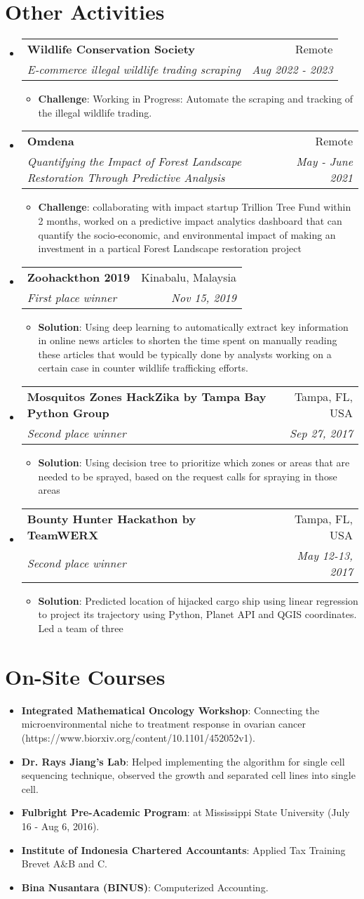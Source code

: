\documentclass[letterpaper,10pt]{article}
\makeatletter
\newcommand{\resumeItem}[2]{
  \item\small{
    \textbf{#1}{: #2 \vspace{-2pt}}
  }
}
\newcommand{\resumeSubheading}[4]{
  \vspace{-1pt}\item
    \begin{tabular*}{0.97\textwidth}[t]{l@{\extracolsep{\fill}}r}
      \textbf{#1} & #2 \\
      \textit{\small#3} & \textit{\small #4} \\
    \end{tabular*}\vspace{-5pt}
}
\newcommand{\resumeSubItem}[2]{\resumeItem{#1}{#2}\vspace{-4pt}}
\newcommand{\resumeSubHeadingListStart}{\begin{itemize}[leftmargin=*]}
\newcommand{\resumeSubHeadingListEnd}{\end{itemize}}
\newcommand{\resumeItemListStart}{\begin{itemize}}
\newcommand{\resumeItemListEnd}{\end{itemize}\vspace{-5pt}}
\makeatother
\begin{document}
\section{Other Activities}
  \resumeSubHeadingListStart
    \resumeSubheading
    {Wildlife Conservation Society}{Remote}
    {E-commerce illegal wildlife trading scraping}{Aug 2022 - 2023}
      \resumeItemListStart
        \resumeItem{Challenge}
        {Working in Progress: Automate the scraping and tracking of the illegal wildlife trading.}
      \resumeItemListEnd
    \resumeSubheading
    {Omdena}{Remote}
    {Quantifying the Impact of Forest Landscape Restoration Through Predictive Analysis}{May - June 2021}
      \resumeItemListStart
        \resumeItem{Challenge}
        {collaborating with impact startup  Trillion Tree Fund within 2 months, worked on a predictive impact analytics dashboard that can quantify the socio-economic, and environmental impact of making an investment in a partical Forest Landscape restoration project}
      \resumeItemListEnd
    \resumeSubheading
    {Zoohackthon 2019}{Kinabalu, Malaysia}
    {First place winner}{Nov 15, 2019}
      \resumeItemListStart
        \resumeItem{Solution}
        {Using deep learning to automatically extract key information in online news articles to shorten the time spent on manually reading these articles that would be typically done by analysts working on a certain case in counter wildlife trafficking efforts.}
      \resumeItemListEnd
    \resumeSubheading
    {Mosquitos Zones HackZika by Tampa Bay Python Group}{Tampa, FL, USA}
    {Second place winner}{Sep 27, 2017}
      \resumeItemListStart
        \resumeItem{Solution}
        {Using decision tree to prioritize which zones or areas that are needed to be sprayed, based on the request calls for spraying in those areas}
      \resumeItemListEnd
    \resumeSubheading
    {Bounty Hunter Hackathon by TeamWERX}{Tampa, FL, USA}
    {Second place winner}{May 12-13, 2017}
      \resumeItemListStart
        \resumeItem{Solution}
        {Predicted location of hijacked cargo ship using linear regression to project its trajectory using Python, Planet API and QGIS coordinates. Led a team of three}
      \resumeItemListEnd

  \resumeSubHeadingListEnd
\section{On-Site Courses}
    \resumeSubHeadingListStart
        \resumeSubItem{Integrated Mathematical Oncology Workshop}
        {Connecting the microenvironmental niche to treatment response in ovarian cancer (https://www.biorxiv.org/content/10.1101/452052v1).}
        \resumeSubItem{Dr. Rays Jiang's Lab}
        {Helped implementing the algorithm for single cell sequencing technique, observed the growth and separated cell lines into single cell.}
        \resumeSubItem{Fulbright Pre-Academic Program}
        {at Mississippi State University (July 16 - Aug 6, 2016).}
        \resumeSubItem{Institute of Indonesia Chartered Accountants}
        {Applied Tax Training Brevet A\&B and C.}
        \resumeSubItem{Bina Nusantara (BINUS)}
        {Computerized Accounting.}
    \resumeSubHeadingListEnd
\end{document}
